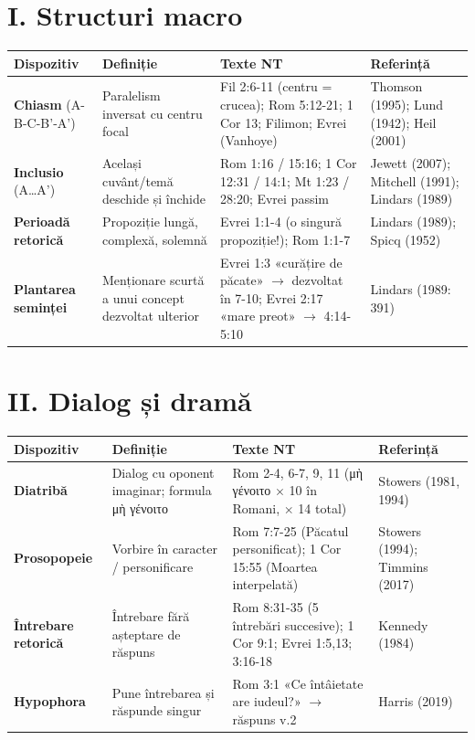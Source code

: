 \documentclass[12pt,a4paper,twoside,openany]{book}
\begin{document}
\section*{I. Structuri macro}
\begin{center}
\footnotesize
\begin{tabular}{L{2.2cm}L{3cm}L{4.5cm}L{3cm}}
\toprule
{}
\textbf{Dispozitiv} & \textbf{Definiție} & \textbf{Texte NT} & \textbf{Referință} \\
\midrule
\textbf{Chiasm} (A-B-C-B'-A') & Paralelism inversat cu centru focal & Fil 2:6-11 (centru = crucea); Rom 5:12-21; 1 Cor 13; Filimon; Evrei (Vanhoye) & Thomson (1995); Lund (1942); Heil (2001) \\
\textbf{Inclusio} (A\ldots A') & Același cuvânt/temă deschide și închide & Rom 1:16 / 15:16; 1 Cor 12:31 / 14:1; Mt 1:23 / 28:20; Evrei passim & Jewett (2007); Mitchell (1991); Lindars (1989) \\
\textbf{Perioadă retorică} & Propoziție lungă, complexă, solemnă & Evrei 1:1-4 (o singură propoziție!); Rom 1:1-7 & Lindars (1989); Spicq (1952) \\
\textbf{Plantarea seminței} & Menționare scurtă a unui concept dezvoltat ulterior & Evrei 1:3 «curățire de păcate» $\rightarrow$ dezvoltat în 7-10; Evrei 2:17 «mare preot» $\rightarrow$ 4:14-5:10 & Lindars (1989: 391) \\
\bottomrule
\end{tabular}
\end{center}

\section*{II. Dialog și dramă}
\begin{center}
\footnotesize
\begin{tabular}{L{2.2cm}L{3cm}L{4.5cm}L{3cm}}
\toprule
{}
\textbf{Dispozitiv} & \textbf{Definiție} & \textbf{Texte NT} & \textbf{Referință} \\
\midrule
\textbf{Diatribă} & Dialog cu oponent imaginar; formula μὴ γένοιτο & Rom 2-4, 6-7, 9, 11 (μὴ γένοιτο $\times$ 10 în Romani, $\times$ 14 total) & Stowers (1981, 1994) \\
\textbf{Prosopopeie} & Vorbire în caracter / personificare & Rom 7:7-25 (Păcatul personificat); 1 Cor 15:55 (Moartea interpelată) & Stowers (1994); Timmins (2017) \\
\textbf{Întrebare retorică} & Întrebare fără așteptare de răspuns & Rom 8:31-35 (5 întrebări succesive); 1 Cor 9:1; Evrei 1:5,13; 3:16-18 & Kennedy (1984) \\
\textbf{Hypophora} & Pune întrebarea și răspunde singur & Rom 3:1 «Ce întâietate are iudeul?» $\rightarrow$ răspuns v.2 & Harris (2019) \\
\bottomrule
\end{tabular}
\end{center}
\end{document}
